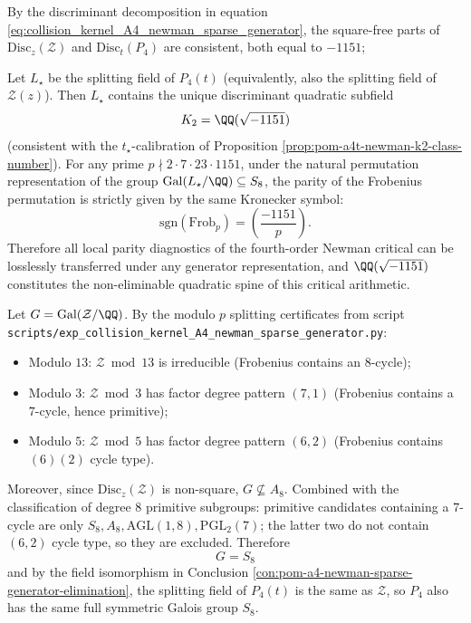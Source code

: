 \begin{conclusion}\label{con:pom-a4-newman-common-quadratic-spine}
By the discriminant decomposition in equation \eqref{eq:collision_kernel_A4_newman_sparse_generator}, the square-free parts of \(\mathrm{Disc}_z(\mathcal Z)\) and \(\mathrm{Disc}_t(P_4)\) are consistent, both equal to \(-1151\);
\par
Let \(L_\star\) be the splitting field of \(P_4(t)\) (equivalently, also the splitting field of \(\mathcal Z(z)\)).
Then \(L_\star\) contains the unique discriminant quadratic subfield
\[
K_2=\QQ(\sqrt{-1151})
\]
(consistent with the \(t_\star\)-calibration of Proposition \ref{prop:pom-a4t-newman-k2-class-number}).
For any prime \(p\nmid 2\cdot 7\cdot 23\cdot 1151\), under the natural permutation representation of the group \(\mathrm{Gal}(L_\star/\QQ)\subseteq S_8\), the parity of the Frobenius permutation is strictly given by the same Kronecker symbol:
\[
\mathrm{sgn}(\mathrm{Frob}_p)=\left(\frac{-1151}{p}\right).
\]
Therefore all local parity diagnostics of the fourth-order Newman critical can be losslessly transferred under any generator representation, and \(\QQ(\sqrt{-1151})\) constitutes the non-eliminable quadratic spine of this critical arithmetic.
\end{conclusion}

\begin{conclusion}\label{con:pom-a4-newman-sparse-galois-s8}
Let \(G=\mathrm{Gal}(\mathcal Z/\QQ)\).
By the modulo \(p\) splitting certificates from script \texttt{scripts/exp\_collision\_kernel\_A4\_newman\_sparse\_generator.py}:
\begin{itemize}
  \item Modulo \(13\): \(\mathcal Z\bmod 13\) is irreducible (Frobenius contains an \(8\)-cycle);
  \item Modulo \(3\): \(\mathcal Z\bmod 3\) has factor degree pattern \((7,1)\) (Frobenius contains a \(7\)-cycle, hence primitive);
  \item Modulo \(5\): \(\mathcal Z\bmod 5\) has factor degree pattern \((6,2)\) (Frobenius contains \((6)(2)\) cycle type).
\end{itemize}
Moreover, since \(\mathrm{Disc}_z(\mathcal Z)\) is non-square, \(G\nsubseteq A_8\).
Combined with the classification of degree \(8\) primitive subgroups: primitive candidates containing a \(7\)-cycle are only \(S_8,A_8,\mathrm{AGL}(1,8),\mathrm{PGL}_2(7)\);
the latter two do not contain \((6,2)\) cycle type, so they are excluded.
Therefore
\[
\boxed{\;G=S_8\;}
\]
and by the field isomorphism in Conclusion \ref{con:pom-a4-newman-sparse-generator-elimination}, the splitting field of \(P_4(t)\) is the same as \(\mathcal Z\), so \(P_4\) also has the same full symmetric Galois group \(S_8\).
\end{conclusion}

